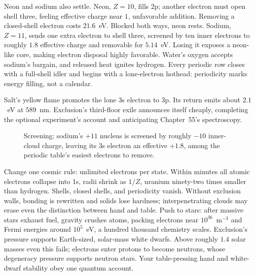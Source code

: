 Neon and sodium also settle. Neon, \(Z=10\), fills 2p; another electron must open shell three, feeling effective charge near \(1\), unfavorable addition. Removing a closed-shell electron costs \(21.6\)~eV. Blocked both ways, neon rests. Sodium, \(Z=11\), sends one extra electron to shell three, screened by ten inner electrons to roughly \(1.8\) effective charge and removable for \(5.14\)~eV. Losing it exposes a neon-like core, making electron disposal highly favorable. Water's oxygen accepts sodium's bargain, and released heat ignites hydrogen. Every periodic row closes with a full-shell idler and begins with a lone-electron hothead: periodicity marks energy filling, not a calendar.

Salt's yellow flame promotes the lone 3s electron to 3p. Its return emits about \(2.1\)~eV at \(589\)~nm. Exclusion's third-floor exile announces itself cheaply, completing the optional experiment's account and anticipating Chapter~55's spectroscopy.

\begin{figure}[htbp]
\centering
{}
\caption{Screening: sodium's \(+11\) nucleus is screened by roughly \(-10\) inner-cloud charge, leaving its 3s electron an effective \(+1.8\), among the periodic table's easiest electrons to remove.}
\end{figure}


\begin{thought}
Change one cosmic rule: unlimited electrons per state. Within minutes all atomic electrons collapse into 1s, radii shrink as \(1/Z\), uranium ninety-two times smaller than hydrogen. Shells, closed shells, and periodicity vanish. Without exclusion walls, bonding is rewritten and solids lose hardness; interpenetrating clouds may erase even the distinction between hand and table. Push to stars: after massive stars exhaust fuel, gravity crushes atoms, packing electrons near \(10^{36}\)~m\(^{-3}\) and Fermi energies around \(10^5\)~eV, a hundred thousand chemistry scales. Exclusion's pressure supports Earth-sized, solar-mass white dwarfs. Above roughly \(1.4\) solar masses even this fails; electrons enter protons to become neutrons, whose degeneracy pressure supports neutron stars. Your table-pressing hand and white-dwarf stability obey one quantum account.
\end{thought}

